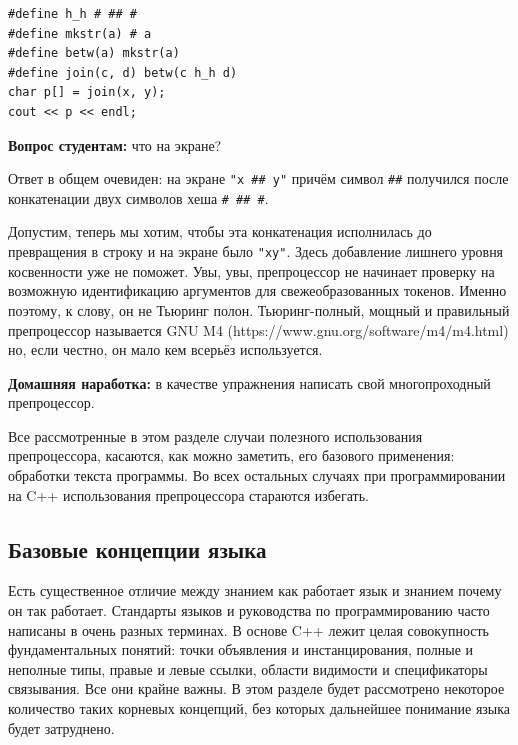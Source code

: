 \documentclass[a4paper,12pt,oneside]{article}
\newif\ifanswers
\begin{document}
\begin{lstlisting}
#define h_h # ## #
#define mkstr(a) # a
#define betw(a) mkstr(a)
#define join(c, d) betw(c h_h d)
char p[] = join(x, y);
cout << p << endl;
\end{lstlisting}

\textbf{Вопрос студентам:} что на экране?

\ifanswers
Порядок расширения следующий:

\begin{lstlisting}
join(x, y)
betw(x # ## # y)
mkstr(x ## y)
"x ## y"
\end{lstlisting}
\fi

Ответ в общем очевиден: на экране \lstinline!"x ## y"! причём символ \lstinline!##! получился после конкатенации двух символов хеша \lstinline!# ## #!.

Допустим, теперь мы хотим, чтобы эта конкатенация исполнилась до превращения в строку и на экране было \lstinline!"xy"!. Здесь добавление лишнего уровня косвенности уже не поможет. Увы, увы, препроцессор не начинает проверку на возможную идентификацию аргументов для свежеобразованных токенов. Именно поэтому, к слову, он не Тьюринг полон. Тьюринг-полный, мощный и правильный препроцессор называется GNU M4 (https://www.gnu.org/software/m4/m4.html) но, если честно, он мало кем всерьёз используется.

\textbf{Домашняя наработка:} в качестве упражнения написать свой многопроходный препроцессор. 

Все рассмотренные в этом разделе случаи полезного использования препроцессора, касаются, как можно заметить, его базового применения: обработки текста программы. Во всех остальных случаях при программировании на C++ использования препроцессора стараются избегать.

\pagebreak
\subsection{Базовые концепции языка}\label{BasicTerms}

Есть существенное отличие между знанием как работает язык и знанием почему он так работает. Стандарты языков и руководства по программированию часто написаны в очень разных терминах. В основе C++ лежит целая совокупность фундаментальных понятий: точки объявления и инстанцирования, полные и неполные типы, правые и левые ссылки, области видимости и спецификаторы связывания. Все они крайне важны. В этом разделе будет рассмотрено некоторое количество таких корневых концепций, без которых дальнейшее понимание языка будет затруднено.
\end{document}
